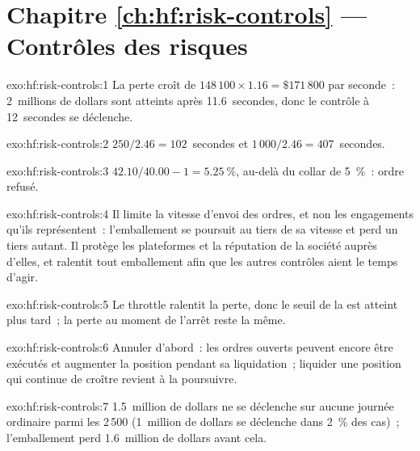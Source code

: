 \section*{Chapitre \ref{ch:hf:risk-controls} --- Contrôles des risques}

\begin{solution}{exo:hf:risk-controls:1}
La perte croît de $148\,100\times1.16=\$171\,800$ par seconde~: 2~millions de dollars sont atteints après 11.6~secondes, donc le contrôle à 12~secondes se déclenche.
\end{solution}

\begin{solution}{exo:hf:risk-controls:2}
$250/2.46=102$~secondes et $1\,000/2.46=407$~secondes.
\end{solution}

\begin{solution}{exo:hf:risk-controls:3}
$42.10/40.00-1=5.25~\%$, au-delà du collar de 5~\%~: ordre refusé.
\end{solution}

\begin{solution}{exo:hf:risk-controls:4}
Il limite la vitesse d'envoi des ordres, et non les engagements qu'ils représentent~: l'emballement se poursuit au tiers de sa vitesse et perd un tiers autant. Il protège les
plateformes et la réputation de la société auprès d'elles, et ralentit tout emballement afin que les autres contrôles aient le temps d'agir.
\end{solution}

\begin{solution}{exo:hf:risk-controls:5}
Le throttle ralentit la perte, donc le seuil de la  est atteint plus tard~; la perte au moment de l'arrêt reste la même.
\end{solution}

\begin{solution}{exo:hf:risk-controls:6}
Annuler d'abord~: les ordres ouverts peuvent encore être exécutés et augmenter la position pendant sa liquidation~; liquider une position qui continue de croître revient à la poursuivre.
\end{solution}

\begin{solution}{exo:hf:risk-controls:7}
1.5~million de dollars ne se déclenche sur aucune journée ordinaire parmi les 2\,500 (1~million de dollars se déclenche dans 2~\% des cas)~; l'emballement perd 1.6~million de dollars avant cela.
\end{solution}

